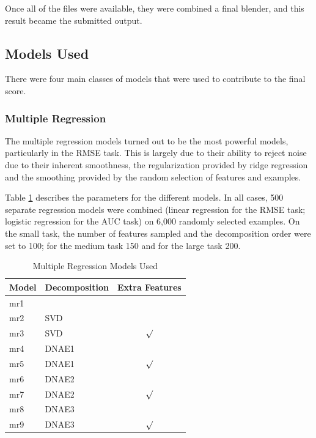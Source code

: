 \documentclass{article}
\begin{document}
Once all of the files were available, they were combined a final blender, and this result became the submitted output.

\subsection{Models Used}

There were four main classes of models that were used to contribute to the final score.

\subsubsection{Multiple Regression}

The multiple regression models turned out to be the most powerful models, particularly in the RMSE task.  This is largely due to their ability to reject noise due to their inherent smoothness, the regularization provided by ridge regression and the smoothing provided by the random selection of features and examples.

Table \ref{table:multiple-regression-models} describes the parameters for the different models.  In all cases, 500 separate regression models were combined (linear regression for the RMSE task; logistic regression for the AUC task) on 6,000 randomly selected examples.  On the small task, the number of features sampled and the decomposition order were set to 100; for the medium task 150 and for the large task 200.

\begin{table}
\caption{Multiple Regression Models Used}
\label{table:multiple-regression-models}
\vskip 0.15in
\begin{center}
\begin{small}
\begin{sc}
\begin{tabular}{llc}
\hline
\abovespace\belowspace
Model & Decomposition & Extra Features \\
\hline
\abovespace
mr1   &        &         \\
mr2   & SVD    &         \\
mr3   & SVD    & $\surd$ \\
mr4   & DNAE1  &         \\
mr5   & DNAE1  & $\surd$ \\
mr6   & DNAE2  &         \\
mr7   & DNAE2  & $\surd$ \\
mr8   & DNAE3  &         \\
\belowspace
mr9   & DNAE3  & $\surd$ \\
\hline
\end{tabular}
\end{sc}
\end{small}
\end{center}
\vskip -0.1in
\end{table}
\end{document}
